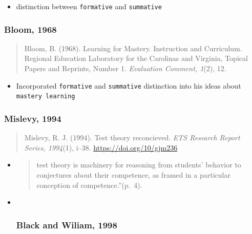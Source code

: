 \documentclass[
]{book}
\providecommand{\tightlist}{%
  \setlength{\itemsep}{0pt}\setlength{\parskip}{0pt}}
\begin{document}
\begin{itemize}
\tightlist
\item
  distinction between \texttt{formative} and \texttt{summative}
\end{itemize}

\hypertarget{bloom-1968}{%
\subsubsection*{Bloom, 1968}\label{bloom-1968}}

\begin{quote}
Bloom, B. (1968). Learning for Mastery. Instruction and Curriculum. Regional Education Laboratory for the Carolinas and Virginia, Topical Papers and Reprints, Number 1. \emph{Evaluation Comment, 1}(2), 12.
\end{quote}

\begin{itemize}
\tightlist
\item
  Incorporated \texttt{formative} and \texttt{summative} distinction into his ideas about \texttt{mastery\ learning}
\end{itemize}

\hypertarget{mislevy-1994}{%
\subsubsection*{Mislevy, 1994}\label{mislevy-1994}}

\begin{quote}
Mislevy, R. J. (1994). Test theory reconcieved. \emph{ETS Research Report Series, 1994}(1), i--38. \url{https://doi.org/10/gjm236}
\end{quote}

\begin{itemize}
\item
  \begin{quote}
  test theory is machinery for reasoning from students' behavior to conjectures about their competence, as framed in a particular conception of competence.''(p.~4).
  \end{quote}
\item ~
  \hypertarget{black-and-wiliam-1998}{%
  \subsubsection*{Black and Wiliam, 1998}\label{black-and-wiliam-1998}}
\end{itemize}
\end{document}
